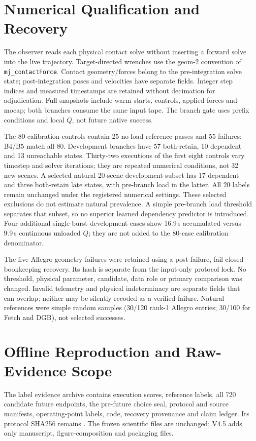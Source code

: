 \documentclass[10pt]{article}
\begin{document}
\section{Numerical Qualification and Recovery}
The observer reads each physical contact solve without inserting a forward
solve into the live trajectory. Target-directed wrenches use the geom-2
convention of \texttt{mj\_contactForce}. Contact geometry/forces belong to the
pre-integration solve state; post-integration poses and velocities have
separate fields. Integer step indices and measured timestamps are retained
without decimation for adjudication. Full snapshots include warm starts,
controls, applied forces and mocap; both branches consume the same input tape.
The branch gate uses prefix conditions and local $Q$, not future native success.

The 80 calibration controls contain 25 no-load reference passes and 55 failures;
B4/B5 match all 80. Development branches have 57 both-retain, 10 dependent and
13 unreachable states. Thirty-two executions of the first eight controls vary
timestep and solver iterations; they are repeated numerical conditions, not
32 new scenes. A selected natural 20-scene development subset has 17 dependent
and three both-retain late states, with pre-branch load in the latter. All
20 labels remain unchanged under the registered numerical settings. These
selected exclusions do not estimate natural prevalence. A simple pre-branch
load threshold separates that subset, so no superior learned dependency
predictor is introduced. Four additional single-burst development cases show
16.9\,s accumulated versus 9.9\,s continuous unloaded $Q$; they are not added
to the 80-case calibration denominator.

The five Allegro geometry failures were retained using a post-failure,
fail-closed bookkeeping recovery. Its hash is separate from the input-only
protocol lock. No threshold, physical parameter, candidate, data role or
primary comparison was changed. Invalid telemetry and physical indeterminacy
are separate fields that can overlap; neither may be silently recoded as a
verified failure. Natural references were simple random samples (30/120
rank-1 Allegro entries; 30/100 for Fetch and DGB), not selected successes.

\section{Offline Reproduction and Raw-Evidence Scope}
The label evidence archive contains execution scores, reference labels,
all 720 candidate future endpoints, the pre-future choice seal, protocol and
source manifests, operating-point labels, code, recovery provenance and claim
ledger. Its protocol SHA256 remains
.
The frozen scientific files are unchanged; V4.5 adds only manuscript,
figure-composition and packaging files.
\end{document}
